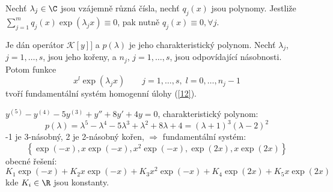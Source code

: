 \begin{lemma}
Nechť $\lambda_j \in \C$ jsou vzájemně různá čísla, nechť $q_j(x)$ jsou polynomy. Jestliže $\sum_{j=1}^m q_j(x) \exp(\lambda_j x) \equiv 0$, pak nutně $q_j(x) \equiv 0, \forall j$.
\end{lemma}

\begin{veta}[F.S. pro $\mathcal K {[y]} = 0$ ]
Je dán operátor $\mathcal K [y]]$ a $p(\lambda)$ je jeho charakteristický polynom. Nechť $\lambda_j$, $j = 1, \ldots, s$, jsou jeho kořeny, a $n_j$, $j = 1, \ldots, s$, jsou odpovídající násobnosti. Potom funkce
\[
x^l \exp(\lambda_j x) \qquad j = 1, \ldots, s, \; l = 0, \ldots, n_j - 1
\]
tvoří fundamentální systém homogenní úlohy (\ref{12}).
\end{veta}

\begin{priklad}
$y^{(5)} - y^{(4)} - 5y^{(3)} + y'' + 8y' + 4y = 0$, charakteristický polynom:
\[
p(\lambda) = \lambda^5 - \lambda^4 - 5\lambda^3 + \lambda^2 + 8\lambda + 4 = (\lambda + 1)^3 (\lambda - 2)^2
\]
-1 je 3-násobný, 2 je 2-násobný kořen, $\Longrightarrow$ fundamentální systém:
\[
\left\{ \exp(-x), x \exp(-x), x^2 \exp(-x), \exp(2x), x \exp(2x) \right\}
\]
obecné řešení:
\[
K_1 \exp(-x) + K_2 x \exp(-x) + K_3 x^2 \exp(-x) + K_4 \exp(2x) + K_5 x \exp(2x)
\]
kde $K_i \in \R$ jsou konstanty.
\end{priklad}
